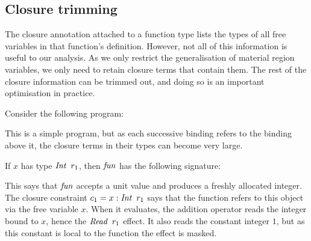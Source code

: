 

\subsection{Closure trimming}
\label{System:Closure:trimming}

The closure annotation attached to a function type lists the types of all free variables in that function's definition. However, not all of this information is useful to our analysis. As we only restrict the generalisation of material region variables, we only need to retain closure terms that contain them. The rest of the closure information can be trimmed out, and doing so is an important optimisation in practice.

Consider the following program:


This is a simple program, but as each successive binding refers to the binding above it, the closure terms in their types can become very large.

If $x$ has type $\operatorname{\mathit{Int}} \ r_1$, then $\operatorname{\mathit{fun}}$ has the following signature:


This says that $\operatorname{\mathit{fun}}$ accepts a unit value and produces a freshly allocated integer. The closure constraint $c_1 = x : \operatorname{\mathit{Int}} \ r_1$ says that the function refers to this object via the free variable $x$. When it evaluates, the addition operator reads the integer bound to $x$, hence the $\operatorname{\mathit{Read}} \ r_1$ effect. It also reads the constant integer $1$, but as this constant is local to the function the effect is masked. 

